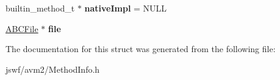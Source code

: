 \begin{DoxyCompactItemize}
\item 
\hypertarget{structjswf_1_1avm2_1_1_method_info_a759661b09d28773bf6868fad09e0318f}{builtin\+\_\+method\+\_\+t $\ast$ {\bfseries native\+Impl} = N\+U\+L\+L}\label{structjswf_1_1avm2_1_1_method_info_a759661b09d28773bf6868fad09e0318f}

\item 
\hypertarget{structjswf_1_1avm2_1_1_method_info_aebf942b78b514c00f0343a28b1786035}{\hyperlink{classjswf_1_1avm2_1_1_a_b_c_file}{A\+B\+C\+File} $\ast$ {\bfseries file}}\label{structjswf_1_1avm2_1_1_method_info_aebf942b78b514c00f0343a28b1786035}

\end{DoxyCompactItemize}


The documentation for this struct was generated from the following file\+:\begin{DoxyCompactItemize}
\item 
jswf/avm2/Method\+Info.\+h\end{DoxyCompactItemize}
